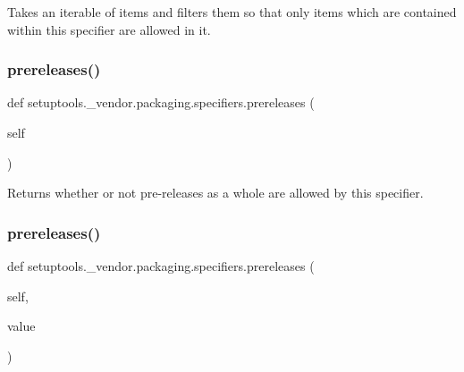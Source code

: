 \begin{DoxyVerb}Takes an iterable of items and filters them so that only items which
are contained within this specifier are allowed in it.
\end{DoxyVerb}
 \mbox{\label{namespacesetuptools_1_1__vendor_1_1packaging_1_1specifiers_acd7e22675e7864a719065c13ef9ef2b5}} 
\subsubsection{\texorpdfstring{prereleases()}{prereleases()}\hspace{0.1cm}{\footnotesize\ttfamily [1/2]}}
{\footnotesize\ttfamily def setuptools.\+\_\+vendor.\+packaging.\+specifiers.\+prereleases (\begin{DoxyParamCaption}\item[{}]{self }\end{DoxyParamCaption})}

\begin{DoxyVerb}Returns whether or not pre-releases as a whole are allowed by this
specifier.
\end{DoxyVerb}
 \mbox{\label{namespacesetuptools_1_1__vendor_1_1packaging_1_1specifiers_a7a68701f475c29180861f133212aef8f}} 
\subsubsection{\texorpdfstring{prereleases()}{prereleases()}\hspace{0.1cm}{\footnotesize\ttfamily [2/2]}}
{\footnotesize\ttfamily def setuptools.\+\_\+vendor.\+packaging.\+specifiers.\+prereleases (\begin{DoxyParamCaption}\item[{}]{self,  }\item[{}]{value }\end{DoxyParamCaption})}


